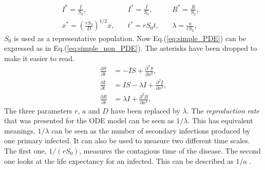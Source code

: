 \documentclass[%
twoside,                 %
final,                   %
10pt]{article}
\begin{document}
\begin{equation} \label{eq:constants_nondimensional}
	\begin{aligned}
	I^* =\frac{I}{S_0},&\quad I^* = \frac{I}{S_0},&\quad R^*= \frac{R}{S_0},&\\
	x^* =\left(\frac{rS_0}{D}\right)^{1/2}x,&\quad t^*=rS_0t,&\quad \lambda =\frac{a}{rS_0},&
	\end{aligned}
\end{equation}
$S_0$ is used as a representative population. Now Eq.(\ref{eq:simple_PDE}) can be expressed as in Eq.(\ref{eq:simple_non_PDE}). The asterisks have been dropped to make it easier to read.
\begin{equation} \label{eq:simple_non_PDE}
	\begin{aligned}
	\frac{\partial S}{\partial t} &= -IS + \frac{\partial^2 S}{\partial x^2},\\
	\frac{\partial I}{\partial t} &= IS- \lambda I + \frac{\partial^2 I}{\partial x^2},\\
	\frac{\partial R}{\partial t} &= \lambda I + \frac{\partial^2 R}{\partial x^2},
	\end{aligned}
\end{equation}
The three parameters $r$, $a$ and $D$ have been replaced by $\lambda$. The \emph{reproduction rate} that was presented for the ODE model can be seen as $1/\lambda $. This has equivalent meanings. $1/\lambda$ can be seen as the number of secondary infections produced by one primary infected. It can also be used to measure two different time scales. The first one, $1/(rS_0)$, measures the contagious time of the disease. The second one looks at the life expectancy for an infected. This can be described as $1/a$ \cite{murray2003mathematical}. 
\end{document}
